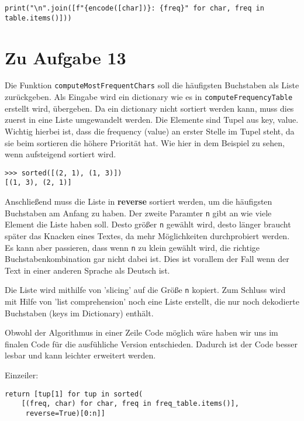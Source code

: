 \documentclass[12pt]{article}
\begin{document}
\begin{lstlisting}
print("\n".join([f"{encode([char])}: {freq}" for char, freq in table.items()]))
\end{lstlisting}

\section{Zu Aufgabe 13}

Die Funktion \texttt{computeMostFrequentChars} soll die häufigsten Buchstaben als Liste zurückgeben. Als Eingabe wird ein dictionary wie es in \texttt{computeFrequencyTable} erstellt wird, übergeben. Da ein dictionary nicht sortiert werden kann, muss dies zuerst in eine Liste umgewandelt werden. Die Elemente sind Tupel aus key, value. Wichtig hierbei ist, dass die frequency (value) an erster Stelle im Tupel steht, da sie beim sortieren die höhere Priorität hat. Wie hier in dem Beispiel zu sehen, wenn aufsteigend sortiert wird.

\begin{lstlisting}
>>> sorted([(2, 1), (1, 3)])
[(1, 3), (2, 1)]     
\end{lstlisting}

Anschließend muss die Liste in \textbf{reverse} sortiert werden, um die häufigsten Buchstaben am Anfang zu haben. Der zweite Paramter \texttt{n} gibt an wie viele Element die Liste haben soll. Desto größer \texttt{n} gewählt wird, desto länger braucht später das Knacken eines Textes, da mehr Möglichkeiten durchprobiert werden. Es kann aber passieren, dass wenn \texttt{n} zu klein gewählt wird, die richtige Buchstabenkombination gar nicht dabei ist. Dies ist vorallem der Fall wenn der Text in einer anderen Sprache als Deutsch ist. 

Die Liste wird mithilfe von 'slicing' auf die Größe \texttt{n} kopiert. Zum Schluss wird mit Hilfe von 'list comprehension' noch eine Liste erstellt, die nur noch dekodierte Buchstaben (keys im Dictionary) enthält.

Obwohl der Algorithmus in einer Zeile Code möglich wäre haben wir uns im finalen Code für die ausfühliche Version entschieden. Dadurch ist der Code besser lesbar und kann leichter erweitert werden. 

Einzeiler:
\begin{lstlisting}
return [tup[1] for tup in sorted(
	[(freq, char) for char, freq in freq_table.items()],
	 reverse=True)[0:n]] 
\end{lstlisting}
\end{document}
